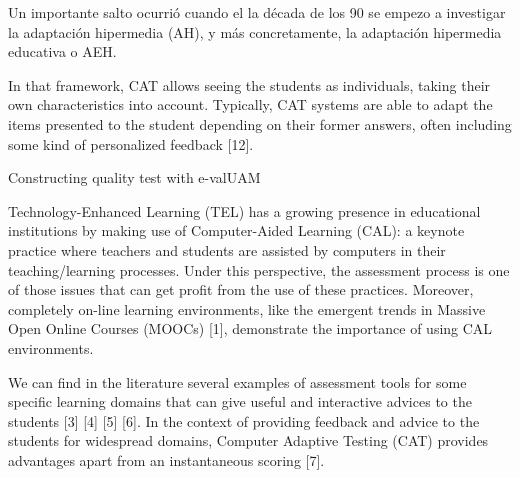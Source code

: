 Un importante salto ocurrió cuando el la década de los 90 se empezo a investigar la adaptación hipermedia (\acrshort{AH}), y más concretamente, la adaptación hipermedia educativa o \acrshort{AEH}.





In that framework, CAT allows seeing the
students as individuals, taking their own characteristics into
account. Typically, CAT systems are able to adapt the items
presented to the student depending on their former answers, often
including some kind of personalized feedback [12].



Constructing quality test with e-valUAM

Technology-Enhanced Learning (TEL) has a growing presence in educational institutions by making use of Computer-Aided Learning (CAL): a keynote practice where teachers and students are assisted by computers in their teaching/learning processes. Under this perspective, the assessment process is one of those issues that can get profit from the use of these practices. Moreover, completely on-line learning environments, like the emergent trends in Massive Open Online Courses (MOOCs) [1], demonstrate the importance of using CAL environments.

We can find in the literature several examples of assessment tools for some specific learning domains that can give useful and interactive advices to the students [3] [4] [5] [6]. In the context of providing feedback and advice to the students for widespread domains, Computer Adaptive Testing (CAT) provides advantages apart from an instantaneous scoring [7]. 


